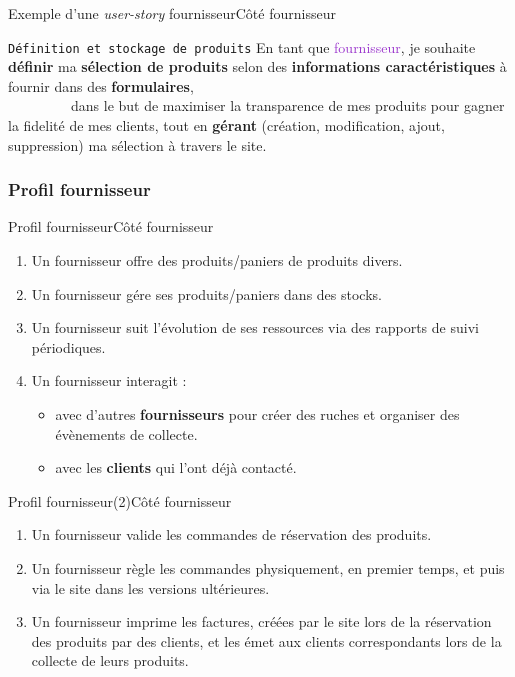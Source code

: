 \documentclass[usenames,dvipsnames]{beamer}
\begin{document}
\begin{frame}{Exemple d'une \textit{user-story} fournisseur}{Côté fournisseur}
\begin{block}{\textcolor{Sepia}{\texttt{Définition et stockage de produits}}}
En tant que \textcolor{DarkOrchid}{fournisseur}, je souhaite {\color{BrickRed} \textbf{définir} ma \textbf{sélection de produits} selon des \textbf{informations caractéristiques} à fournir dans des \textbf{formulaires}},\\
~~~~~~~~~dans le but de {\color{OliveGreen}maximiser la transparence de mes produits pour gagner la fidelité de mes clients, tout en \textbf{gérant} (création, modification, ajout, suppression) ma sélection à travers le site}.
\end{block}
\end{frame}

\subsubsection*{Profil fournisseur}
\begin{frame}{Profil fournisseur}{Côté fournisseur}
\begin{enumerate}
  \item Un fournisseur offre des produits/paniers de produits divers.
  \item Un fournisseur gére ses produits/paniers dans des stocks.
  \item Un fournisseur suit l'évolution de ses ressources via des rapports de suivi périodiques.
  \item Un fournisseur interagit :
  \begin{itemize}
    \item avec d'autres \textbf{fournisseurs} pour créer des ruches et organiser des évènements de collecte.
    \item avec les \textbf{clients} qui l'ont déjà contacté.
  \end{itemize}
\end{enumerate}
\end{frame}

\begin{frame}{Profil fournisseur(2)}{Côté fournisseur}
\begin{enumerate}
  \item Un fournisseur valide les commandes de réservation des produits.
  \item Un fournisseur règle les commandes physiquement, en premier temps, et puis via le site dans les versions ultérieures.
  \item Un fournisseur imprime les factures, créées par le site lors de la réservation des produits par des clients, et les émet aux clients correspondants lors de la collecte de leurs produits.
\end{enumerate}
\end{frame}
\end{document}
